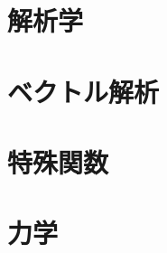 \documentclass[a4j]{jsbook}
\begin{document}
%
%

%
%
\chapter{解析学}






%
%
\chapter{ベクトル解析}









%
%
\chapter{特殊関数}




%
%

%
%
\chapter{力学}

\end{document}
